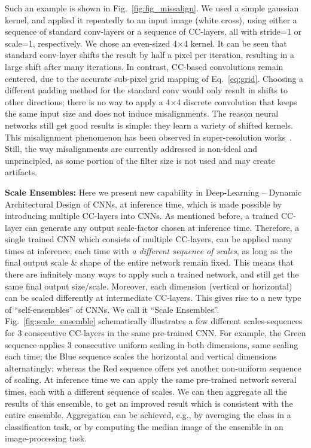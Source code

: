 Such an example is shown in Fig.~\ref{fig:fig_missalign}. 
We used a simple gaussian kernel,  and applied it repeatedly to an input image (white cross), using either a sequence of standard conv-layers or a sequence of CC-layers, all with stride=1 or scale=1, respectively. We chose an even-sized 4$\times$4 kernel. It can be seen that standard conv-layer shifts the result by half a pixel per iteration, resulting in a large shift after many iterations. In contrast, CC-based convolutions remain centered, due to the accurate sub-pixel grid mapping of Eq.~\ref{eq:grid}. Choosing a different padding method for the standard conv would only result in shifts to other directions; there is no way to apply a 4$\times$4 discrete convolution that keeps the same input size and does not induce misalignments. The reason neural networks still get good results is simple: they learn a variety of shifted kernels. This misalignment phenomenon has been observed in super-resolution works~\cite{zhang2020deep, ZSSR}. Still, the way  misalignments are currently addressed is non-ideal and unprincipled, as some portion of the filter size is not used and may create artifacts.

\textbf{Scale Ensembles:} Here we present 
new capability in Deep-Learning -- Dynamic Architectural Design of CNNs, at inference time, which is made possible by introducing multiple CC-layers into CNNs.  As mentioned before, a trained CC-layer can generate any output scale-factor chosen at inference time. Therefore, a single trained CNN which consists of multiple CC-layers, can be applied many times at inference, each time with \emph{a different sequence of scales}, as long as the final output scale \& shape of the entire network remain fixed. This means that there are infinitely many ways to apply such a trained network, and still get the same final output size/scale.  Moreover, each dimension (vertical or horizontal) can be scaled differently at intermediate CC-layers. This gives rise to a new type of ``self-ensembles'' of CNNs. We call it ``Scale Ensembles''.  Fig.~\ref{fig:scale_ensemble} schematically illustrates a few different scales-sequences for 3 consecutive CC-layers in the same pre-trained CNN. For example, the Green sequence applies 3 consecutive uniform scaling in both dimensions, same scaling each time; 
the Blue sequence scales  the horizontal and vertical dimensions alternatingly; whereas the Red sequence offers yet another non-uniform sequence of scaling. At inference time we can apply the same pre-trained network several times, each with a different sequence of scales. We can then aggregate all the results of this ensemble,  to get an improved result  which is consistent with the entire ensemble. Aggregation can be achieved, e.g., by  averaging the class 
in a classification task,  or by computing the median image of the ensemble in an image-processing task.

